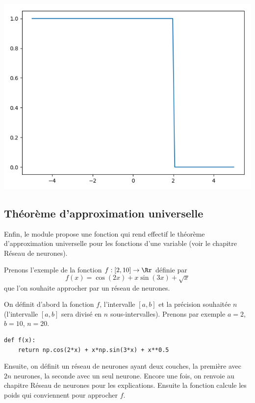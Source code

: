 \documentclass[11pt,class=report,crop=false]{standalone}
\begin{document}
\begin{center}
\includegraphics[scale=\myscale,scale=0.4]{figures/pythontf-1var-01}
\end{center}



\subsection{Théorème d'approximation universelle}


Enfin, le module  propose une fonction  qui rend effectif le théorème d'approximation universelle pour les fonctions d'une variable (voir le chapitre \og{}Réseau de  neurones\fg{}).


Prenons l'exemple de la fonction $f : [2,10] \to \Rr$ définie par 
$$f(x) = \cos(2x) + x\sin(3x) + \sqrt{x}$$
que l'on souhaite approcher par un réseau de neurones.


On définit d'abord la fonction $f$, l'intervalle $[a,b]$ et
la précision souhaitée $n$ (l'intervalle $[a,b]$ sera divisé en $n$ sous-intervalles).
Prenons par exemple $a=2$, $b=10$, $n=20$.
\begin{lstlisting}
def f(x):
    return np.cos(2*x) + x*np.sin(3*x) + x**0.5
\end{lstlisting}


Ensuite, on définit un réseau de neurones ayant deux couches, la première avec $2n$ neurones, la seconde avec un seul neurone. Encore une fois, on renvoie au chapitre \og{}Réseau de  neurones\fg{} pour les explications. Ensuite la fonction  calcule les poids qui conviennent pour approcher $f$. 
\end{document}
